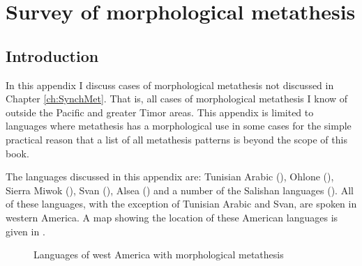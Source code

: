 \chapter{Survey of morphological metathesis}\label{app:MorMet}

\section{Introduction}
In this appendix I discuss cases of morphological metathesis
not discussed in Chapter \ref{ch:SynchMet}.
That is, all cases of morphological metathesis I know of
outside the Pacific and greater Timor areas.
This appendix is limited to languages where metathesis
has a morphological use in some cases for the simple practical reason that
a list of all metathesis patterns is beyond the scope of this book.

The languages discussed in this appendix are:
Tunisian Arabic (),
Ohlone (), Sierra Miwok (), Svan (),
Alsea () and a number of the Salishan languages ().
All of these languages, with the exception of Tunisian Arabic
and Svan, are spoken in western America.
A map showing the location of these American languages
is given in .

\begin{figure}[h]
	\centering
		\setlength\fboxsep{-0.5pt}\setlength\fboxrule{0.75pt}
		\caption{Languages of west America with morphological metathesis}\label{fig:LanWesAmeMorMet}
\end{figure}








